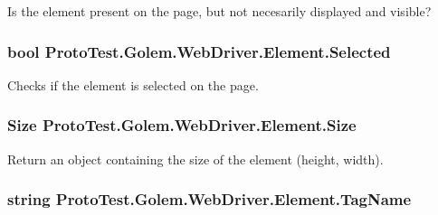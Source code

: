 Is the element present on the page, but not necesarily displayed and visible? 

\hypertarget{class_proto_test_1_1_golem_1_1_web_driver_1_1_element_a674df76d24ad9569b9c76aaa7f61fe23}{
\subsubsection[{Selected}]{\setlength{\rightskip}{0pt plus 5cm}bool Proto\-Test.\-Golem.\-Web\-Driver.\-Element.\-Selected\hspace{0.3cm}{\ttfamily [get]}}}\label{class_proto_test_1_1_golem_1_1_web_driver_1_1_element_a674df76d24ad9569b9c76aaa7f61fe23}


Checks if the element is selected on the page. 

\hypertarget{class_proto_test_1_1_golem_1_1_web_driver_1_1_element_aa4238f30d0a8b17147135c261b6a4460}{
\subsubsection[{Size}]{\setlength{\rightskip}{0pt plus 5cm}Size Proto\-Test.\-Golem.\-Web\-Driver.\-Element.\-Size\hspace{0.3cm}{\ttfamily [get]}}}\label{class_proto_test_1_1_golem_1_1_web_driver_1_1_element_aa4238f30d0a8b17147135c261b6a4460}


Return an object containing the size of the element (height, width). 

\hypertarget{class_proto_test_1_1_golem_1_1_web_driver_1_1_element_a9a7f8583131d5e0a97e8280e56617360}{
\subsubsection[{Tag\-Name}]{\setlength{\rightskip}{0pt plus 5cm}string Proto\-Test.\-Golem.\-Web\-Driver.\-Element.\-Tag\-Name\hspace{0.3cm}{\ttfamily [get]}}}\label{class_proto_test_1_1_golem_1_1_web_driver_1_1_element_a9a7f8583131d5e0a97e8280e56617360}


